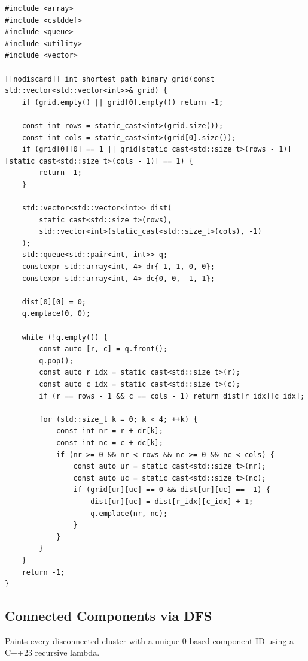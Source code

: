 \documentclass[11pt,a4paper]{article}
\theoremstyle{definition}
\begin{document}
\begin{lstlisting}[caption={2D Grid Shortest Path BFS with 4-directional offsets}]
#include <array>
#include <cstddef>
#include <queue>
#include <utility>
#include <vector>

[[nodiscard]] int shortest_path_binary_grid(const std::vector<std::vector<int>>& grid) {
    if (grid.empty() || grid[0].empty()) return -1;

    const int rows = static_cast<int>(grid.size());
    const int cols = static_cast<int>(grid[0].size());
    if (grid[0][0] == 1 || grid[static_cast<std::size_t>(rows - 1)][static_cast<std::size_t>(cols - 1)] == 1) {
        return -1;
    }

    std::vector<std::vector<int>> dist(
        static_cast<std::size_t>(rows),
        std::vector<int>(static_cast<std::size_t>(cols), -1)
    );
    std::queue<std::pair<int, int>> q;
    constexpr std::array<int, 4> dr{-1, 1, 0, 0};
    constexpr std::array<int, 4> dc{0, 0, -1, 1};

    dist[0][0] = 0;
    q.emplace(0, 0);

    while (!q.empty()) {
        const auto [r, c] = q.front();
        q.pop();
        const auto r_idx = static_cast<std::size_t>(r);
        const auto c_idx = static_cast<std::size_t>(c);
        if (r == rows - 1 && c == cols - 1) return dist[r_idx][c_idx];

        for (std::size_t k = 0; k < 4; ++k) {
            const int nr = r + dr[k];
            const int nc = c + dc[k];
            if (nr >= 0 && nr < rows && nc >= 0 && nc < cols) {
                const auto ur = static_cast<std::size_t>(nr);
                const auto uc = static_cast<std::size_t>(nc);
                if (grid[ur][uc] == 0 && dist[ur][uc] == -1) {
                    dist[ur][uc] = dist[r_idx][c_idx] + 1;
                    q.emplace(nr, nc);
                }
            }
        }
    }
    return -1;
}
\end{lstlisting}

\subsection{Connected Components via DFS}
Paints every disconnected cluster with a unique $0$-based component ID using a C++23 recursive lambda.
\end{document}
